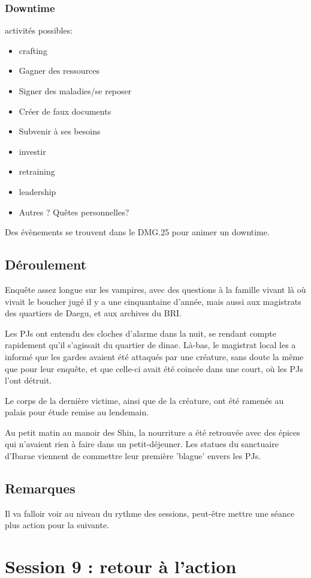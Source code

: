 \documentclass[10pt,a4paper]{book}
\begin{document}
\subsubsection{Downtime}
activités possibles:
\begin{itemize}
\item crafting
\item Gagner des ressources
\item Signer des maladies/se reposer
\item Créer de faux documents
\item Subvenir à ses besoins
\item investir
\item retraining
\item leadership
\item Autres ? Quêtes personnelles?
\end{itemize}
Des évènements se trouvent dans le DMG.25 pour animer un downtime.
\subsection{Déroulement}
Enquête assez longue sur les vampires, avec des questions à la famille vivant là où vivait le boucher jugé il y a une cinquantaine d'année, mais aussi aux magistrats des quartiers de Daegu, et aux archives du BRI.

Les PJs ont entendu des cloches d'alarme dans la nuit, se rendant compte rapidement qu'il s'agissait du quartier de dinae. Là-bas, le magistrat local les a informé que les gardes avaient été attaqués par une créature, sans doute la même que pour leur enquête, et que celle-ci avait été coincée dans une court, où les PJs l'ont détruit.

Le corps de la dernière victime, ainsi que de la créature, ont été ramenés au palais pour étude remise au lendemain.

Au petit matin au manoir des Shin, la nourriture a été retrouvée avec des épices qui n'avaient rien à faire dans un petit-déjeuner. Les statues du sanctuaire d'Ibarae viennent de commettre leur première 'blague' envers les PJs.
\subsection{Remarques}
Il va falloir voir au niveau du rythme des sessions, peut-être mettre une séance plus action pour la suivante.
\section{Session 9 : retour à l'action}
\end{document}
